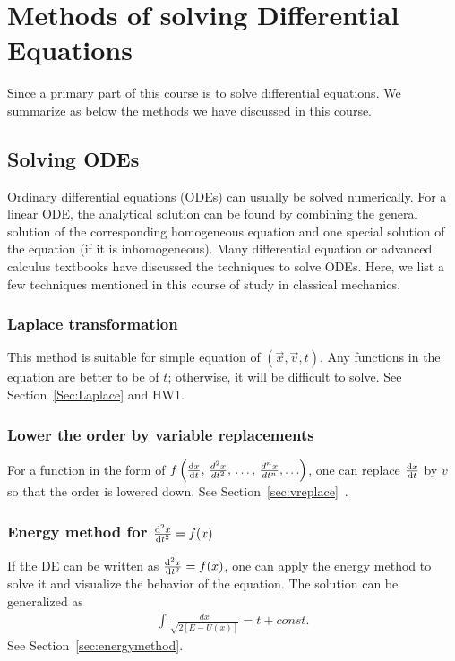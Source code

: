 
\chapter{Methods of solving Differential Equations}
Since a primary part of this course is to solve differential equations. We summarize as below the methods we have discussed in this course. 

\section{Solving ODEs}
Ordinary differential equations (ODEs) can usually be solved numerically. For a linear ODE, the analytical solution can be found by combining the general solution of the corresponding homogeneous equation and one special solution of the equation (if it is inhomogeneous). Many differential equation or advanced calculus textbooks have discussed the techniques to solve ODEs. Here, we list a few techniques mentioned in this course of study in classical mechanics. 

\subsection{Laplace transformation}
This method is suitable for simple equation of $(\vec{x},\vec{v},t)$. Any functions in the equation are better to be of $ t $; otherwise, it will be difficult to solve. See Section~\ref{Sec:Laplace} and HW1. 

\subsection {Lower the order by variable replacements}
For a function in the form of $f\left(\frac{{\mathrm d} {x}}{{\mathrm d}t},\,\frac{d^2 x}{dt^2},\,\ldots,\,\frac{d^n x}{dt^n},\ldots \right)$, one can replace $ \frac{{\mathrm d} {x}}{{\mathrm d}t} $ by $ v $ so that the order is lowered down. See Section~\ref{sec:vreplace}~.

\subsection{Energy method for $ \frac{{\mathrm d}^2 {x}}{{\mathrm d}t^2}=f(x) $}
If the DE can be written as $ \frac{{\mathrm d}^2 {x}}{{\mathrm d}t^2}=f(x) $, one can apply the energy method to solve it and visualize the behavior of the equation. The solution can be generalized as 
\begin{align}
\int{\frac{dx}{\sqrt{2[E-U(x)]}}}=t+const.
\end{align}
See Section~\ref{sec:energymethod}.

